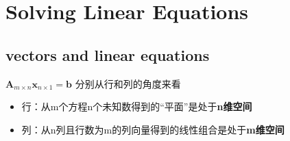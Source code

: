    \section{Solving Linear Equations}
    \subsection{vectors and linear equations}
    $\bm{A}_{m\times n}\bm{x}_{n \times 1}=\bm{b}$ 分别从行和列的角度来看
    \begin{itemize}
        \item 行：从m个方程n个未知数得到的“平面”是处于\textbf{n维空间}
        \item 列：从n列且行数为m的列向量得到的线性组合是处于\textbf{m维空间}
    \end{itemize}

